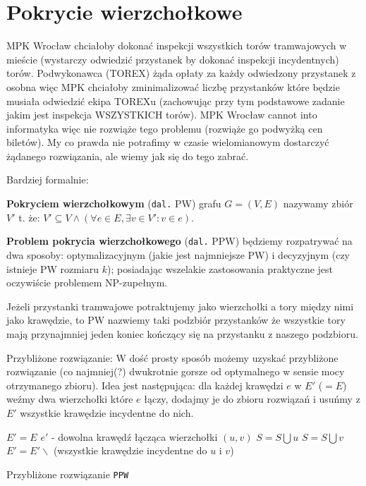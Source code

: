 \section{Pokrycie wierzchołkowe}

\label{sec:vertex-cover}

MPK Wrocław chciałoby dokonać inspekcji wszystkich torów tramwajowych w mieście (wystarczy odwiedzić przystanek by dokonać inspekcji incydentnych) torów. Podwykonawca (TOREX) żąda opłaty za każdy odwiedzony przystanek z osobna więc MPK chciałoby zminimalizować liczbę przystanków które będzie musiała odwiedzić ekipa TOREXu (zachowując przy tym podstawowe zadanie jakim jest inspekcja WSZYSTKICH torów). 
MPK Wrocław cannot into informatyka więc nie rozwiąże tego problemu (rozwiąże go podwyżką cen biletów). My co prawda nie potrafimy w czasie wielomianowym dostarczyć żądanego rozwiązania, ale wiemy jak się do tego zabrać.

Bardziej formalnie:  

\begin{definition}
  \textbf{Pokryciem wierzchołkowym} (\texttt{dal.} PW) grafu $G = (V,E)$ nazywamy zbiór $V'$ t. że:
  $V' \subseteq V \wedge (\forall e\in E, \exists v\in V':  v \in e)$.
\end{definition}
\textbf{Problem pokrycia wierzchołkowego} (\texttt{dal.} PPW) będziemy rozpatrywać na dwa sposoby: optymalizacyjnym (jakie jest najmniejsze PW) i decyzyjnym (czy istnieje PW rozmiaru $k$); posiadając wszelakie zastosowania praktyczne jest oczywiście problemem NP-zupełnym.
  
Jeżeli przystanki tramwajowe potraktujemy jako wierzchołki a tory między  nimi jako krawędzie, to PW nazwiemy taki podzbiór przystanków że wszystkie tory mają przynajmniej jeden koniec kończący się na przystanku z naszego podzbioru. 

Przybliżone rozwiązanie:
W dość prosty sposób możemy uzyskać przybliżone rozwiązanie (co najmniej(?) dwukrotnie gorsze od optymalnego w sensie mocy otrzymanego zbioru). Idea jest następująca: dla każdej krawędzi $e$ w $E'$ ($=E$) weźmy dwa wierzchołki które $e$ łączy, dodajmy je do zbioru rozwiązań i usuńmy z $E'$ wszystkie krawędzie incydentne do nich. 

\begin{algorithm}[h]
  \DontPrintSemicolon
  \SetAlgorithmName{}{}

  $E' = E$
  {
  $e'$ - dowolna krawędź łącząca wierzchołki $(u,v)$
  $S = S \bigcup u$ 
  $S = S \bigcup v$
  $E' = E' \backslash$ (wszystkie krawędzie incydentne do $u$ i $v$) 
  }
  \caption{Przybliżone rozwiązanie \texttt{PPW}}
  \label{problem-pokrycia-wierzcholkowego}  
\end{algorithm}


